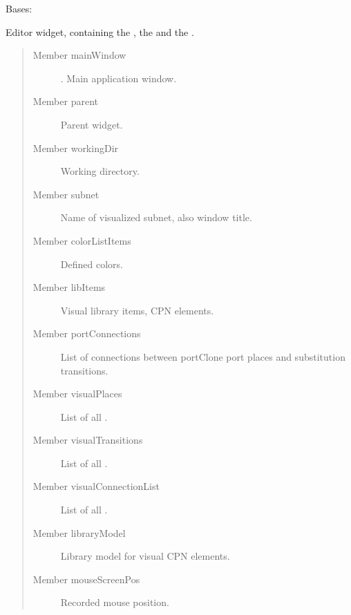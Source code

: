 \documentclass[a4paper,10pt,english]{sphinxmanual}
\begin{document}
\begin{fulllineitems}
\label{gui_link:gui.DiagramEditor.DiagramEditor}
Bases: 

Editor widget, containing the , the  and the .
\begin{quote}\begin{description}
\item[{Member mainWindow}] \leavevmode
{}. Main application window.

\item[{Member parent}] \leavevmode
Parent widget.

\item[{Member workingDir}] \leavevmode
Working directory.

\item[{Member subnet}] \leavevmode
Name of visualized subnet, also window title.

\item[{Member colorListItems}] \leavevmode
Defined colors.

\item[{Member libItems}] \leavevmode
Visual library items, CPN elements.

\item[{Member portConnections}] \leavevmode
List of connections between portClone port places and substitution transitions.

\item[{Member visualPlaces}] \leavevmode
List of all .

\item[{Member visualTransitions}] \leavevmode
List of all .

\item[{Member visualConnectionList}] \leavevmode
List of all .

\item[{Member libraryModel}] \leavevmode
Library model for visual CPN elements.

\item[{Member mouseScreenPos}] \leavevmode
Recorded mouse position.


\end{description}
\end{quote}
\end{fulllineitems}
\end{document}
